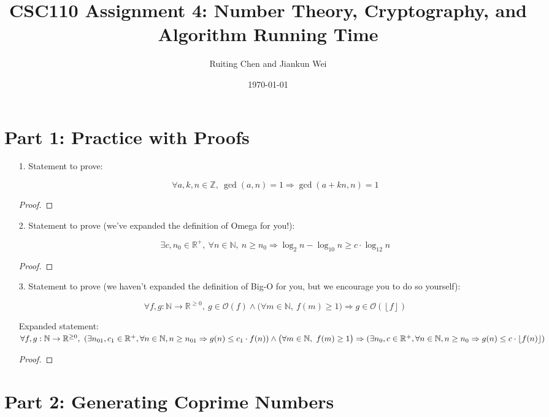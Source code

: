 \documentclass[fontsize=11pt]{article}
\title{CSC110 Assignment 4: Number Theory, Cryptography, and Algorithm Running Time}
\author{Ruiting Chen and Jiankun Wei}
\date{\today}
\newcommand{\N}{\mathbb{N}}
\newcommand{\Z}{\mathbb{Z}}
\newcommand{\R}{\mathbb{R}}
\newcommand{\cO}{\mathcal{O}}
\newcommand{\floor}[1]{\left\lfloor #1 \right\rfloor}
\begin{document}
\maketitle

\section*{Part 1: Practice with Proofs}

\begin{enumerate}

\item[1.] Statement to prove:

$$\forall a, k, n \in \Z,~ \gcd(a, n) = 1 \Rightarrow \gcd(a + kn, n) = 1$$

\begin{proof}

\end{proof}

\item[2.] Statement to prove (we've expanded the definition of Omega for you!):

$$\exists c, n_0 \in \R^+,~ \forall n \in \N,~ n \geq n_0 \Rightarrow \log_{2} n - \log_{10} n \geq c \cdot \log_{12} n$$

\begin{proof}

\end{proof}

\item[3.] Statement to prove (we haven't expanded the definition of Big-O for you, but we encourage you to do so yourself):

$$\forall f, g: \N \to \R^{\geq 0},~ g \in \cO(f) \land \big(\forall m \in \N,~ f(m) \geq 1 \big) \Rightarrow g \in \cO(\floor{f})$$

Expanded statement: $\forall f, g: \N \to \R^{\geq 0},~ (\exists n_{01}, c_1 \in \R^+, \forall n \in \N, n \geq n_{01} \Rightarrow g(n) \leq c_1 \cdot f(n) ) \land \\
\big(\forall m \in \N,~ f(m) \geq 1 \big) \Rightarrow (\exists n_{0}, c \in \R^+, \forall n \in \N, n \geq n_{0} \Rightarrow g(n) \leq c \cdot \floor{f(n)}) $
\begin{proof}
\end{proof} 

\end{enumerate}

\newpage

\section*{Part 2: Generating Coprime Numbers}
\end{document}
